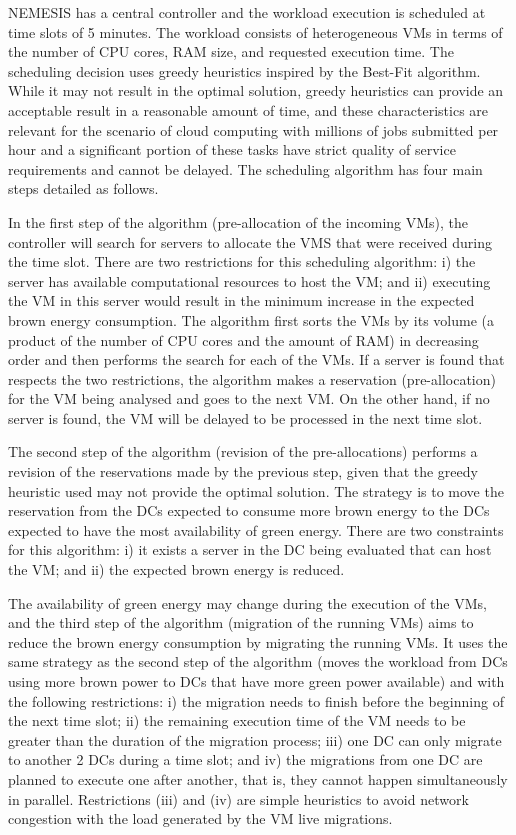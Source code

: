 NEMESIS has a central controller and the workload execution is scheduled at time slots of 5 minutes. The workload consists of heterogeneous VMs in terms of the number of CPU cores, RAM size, and requested execution time. The scheduling decision uses greedy heuristics inspired by the Best-Fit algorithm. While it may not result in the optimal solution, greedy heuristics can provide an acceptable result in a reasonable amount of time, and these characteristics are relevant for the scenario of cloud computing with millions of jobs submitted per hour and a significant portion of these tasks have strict quality of service requirements and cannot be delayed.  The scheduling algorithm has four main steps detailed as follows. 

In the first step of the algorithm (pre-allocation of the incoming
VMs), the controller will search for servers to allocate the VMS that were received during the time slot. There are two restrictions
for this scheduling algorithm: i) the server has available
computational resources to host the VM;  and ii) executing the VM in
this server would result in the minimum increase in the expected brown
energy consumption. The algorithm first sorts the VMs by its volume (a product of the number of CPU cores and the amount of RAM) in decreasing order and then performs the search for each of the VMs. If a server is found that respects the two restrictions, the algorithm makes a reservation (pre-allocation) for the VM being analysed and goes to the next VM. On the other hand, if no server is found, the VM will be delayed to be processed in the next time slot.

The second step of the algorithm (revision of the pre-allocations) performs a revision of the
reservations made by the previous step, given that the greedy heuristic used may not
provide the optimal solution.  The strategy is to move the reservation from the DCs
expected to consume more brown energy to the DCs expected to have the
most availability of green energy.  There are two constraints for this
algorithm: i) it exists a server in the DC being evaluated that can host
the VM; and ii) the expected brown energy is reduced.

The availability of green energy may change during the execution of
the VMs, and the third step of the algorithm (migration of the running
VMs) aims to reduce the brown energy consumption by migrating the running VMs. It uses the same strategy as the second step of the algorithm (moves the workload
from DCs using more brown power to DCs that have more green power
available) and with the following restrictions: i) the migration needs
to finish before the beginning of the next time slot; ii) the remaining execution time of the VM needs to be greater than the duration of the migration process; iii) one DC can only
migrate to another 2 DCs during a time slot; and iv) the migrations
from one DC are planned to execute one after another, that is, they
cannot happen simultaneously in parallel. Restrictions (iii) and (iv)
are simple heuristics to avoid network congestion with the load
generated by the VM live migrations.

